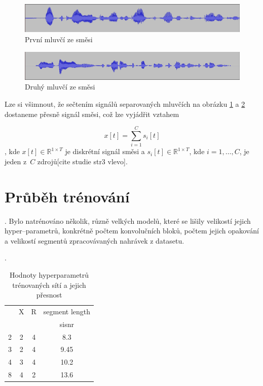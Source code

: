 \begin{figure}[H]
    \centering
    \includegraphics[scale=0.35]{obrazky-figures/dataset-s1.png}
    \caption{\label{fig:ref-s1}První mluvčí ze směsi}
\end{figure}

\begin{figure}[H]
    \centering
    \includegraphics[scale=0.35]{obrazky-figures/dataset-s2.png}
    \caption{\label{fig:ref-s2}Druhý mluvčí ze směsi}
\end{figure}

Lze si všimnout, že sečtením signálů separovaných mluvčích na obrázku \ref{fig:ref-s1} a \ref{fig:ref-s2} dostaneme přesně signál směsi, což lze vyjádřit vztahem

\begin{equation}
  x[t] = \sum_{i=1}^C s_i[t]
\end{equation}
, kde $x[t] \in \mathbb{R}^{1 \times T}$ je diskrétní signál směsi a $s_i[t] \in \mathbb{R}^{1 \times T}$, kde $i = 1,\ldots,C$, je jeden z~$C$ zdrojů[cite studie str3 vlevo]. 





\section{Průběh trénování}
.
Bylo natrénováno několik, různě velkých modelů, které se lišily velikostí jejich hyper--parametrů, konkrétně počtem konvolučních bloků, počtem jejich opakování a velikostí segmentů zpracovávaných nahrávek z datasetu. 

.

\begin{table}[hbt]
\centering
\caption{Hodnoty hyperparametrů trénovaných sítí a jejich přesnost}
\label{hodnoty}
\begin{tabular}{|l|c|c|c|}
\hline
 & X & R & segment length  \\
 &  &  & sisnr  \\ \hline
2 & 2 & 4 & 8.3 \\ \hline
3 & 2 & 4& 9.45 \\ \hline
4 & 3 & 4 & 10.2 \\ \hline
8 & 4 & 2 & 13.6 \\ \hline
\end{tabular}
\end{table}


